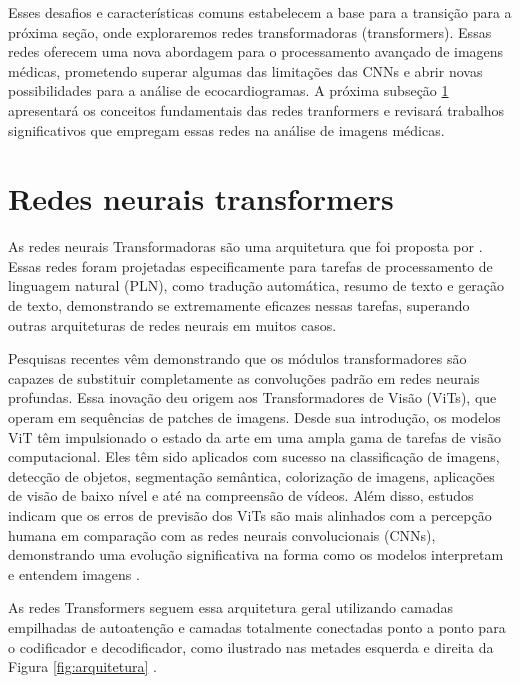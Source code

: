 Esses desafios e características comuns estabelecem a base para a transição para a próxima seção, onde exploraremos redes transformadoras (transformers). Essas redes oferecem uma nova abordagem para o processamento avançado de imagens médicas, prometendo superar algumas das limitações das CNNs e abrir novas possibilidades para a análise de ecocardiogramas. A próxima subseção \ref{subsec:Redes neurais transformers} apresentará os conceitos fundamentais das redes tranformers e revisará trabalhos significativos que empregam essas redes na análise de imagens médicas.


\section{Redes neurais transformers}
\label{subsec:Redes neurais transformers}

As redes neurais Transformadoras são uma arquitetura que foi proposta  por \textcite{https://doi.org/10.48550/arxiv.1706.03762}. Essas redes foram projetadas especificamente para tarefas de processamento de linguagem natural (PLN), como tradução automática, resumo de texto e geração de texto, demonstrando se extremamente eficazes nessas tarefas, superando outras arquiteturas de redes neurais em muitos casos.

Pesquisas recentes vêm demonstrando que os módulos transformadores são capazes de substituir completamente as convoluções padrão em redes neurais profundas. Essa inovação deu origem aos Transformadores de Visão (ViTs), que operam em sequências de patches de imagens. Desde sua introdução, os modelos ViT têm impulsionado o estado da arte em uma ampla gama de tarefas de visão computacional. Eles têm sido aplicados com sucesso na classificação de imagens, detecção de objetos, segmentação semântica, colorização de imagens, aplicações de visão de baixo nível e até na compreensão de vídeos. Além disso, estudos indicam que os erros de previsão dos ViTs são mais alinhados com a percepção humana em comparação com as redes neurais convolucionais (CNNs), demonstrando uma evolução significativa na forma como os modelos interpretam e entendem imagens \cite{SHAMSHAD2023102802}.

As redes Transformers seguem essa arquitetura geral utilizando camadas empilhadas de autoatenção e camadas totalmente conectadas ponto a ponto para o codificador e decodificador, como ilustrado nas metades esquerda e direita da Figura \ref{fig:arquitetura} \cite{https://doi.org/10.48550/arxiv.1706.03762}. 


